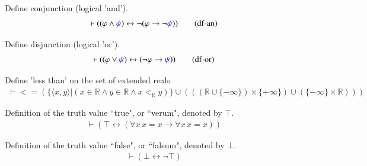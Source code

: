\begin{definition} Define conjunction (logical 'and'). 
\begin{align}
\vdash ( ( \varphi \wedge \mw{\psi} ) \leftrightarrow \lnot ( \varphi \rightarrow
    \lnot \mw{\psi} ) )\label{eq:df-an}\tag{df-an}
\end{align}
\end{definition}

\begin{definition} Define disjunction (logical 'or'). 
\begin{align}
\vdash ( ( \varphi \vee \mw{\psi} ) \leftrightarrow ( \lnot \varphi \rightarrow \mw{\psi}
    ) )\label{eq:df-or}\tag{df-or}
\end{align}
\end{definition}

\begin{definition} Define 'less than' on the set of
extended reals. 
\begin{align}
\vdash < = ( \{ \langle x , y \rangle | ( x \in \mathbb{R} \wedge y \in
    \mathbb{R} \wedge x <_\mathbb{R} y ) \} \cup ( ( ( \mathbb{R} \cup \{
    -\infty \} ) \times \{ +\infty \} ) \cup ( \{ -\infty \} \times \mathbb{R}
    ) ) )\label{eq:df-ltxr}\tag{df-ltxr}
\end{align}
\end{definition}

\begin{definition} Definition of the truth value ``true", or
``verum", denoted by $\top$.
\begin{align}
\vdash ( \top \leftrightarrow ( \forall x \,x = x \rightarrow \forall x \,x = x
    ) )\label{eq:df-tru}\tag{df-tru}
\end{align}

\end{definition}
\begin{definition} Definition of the truth value ``false",
or ``falsum", denoted by $\bot$.
\begin{align}
\vdash ( \bot \leftrightarrow \lnot \top )\label{eq:df-fal}\tag{df-fal}
\end{align}
\end{definition}



